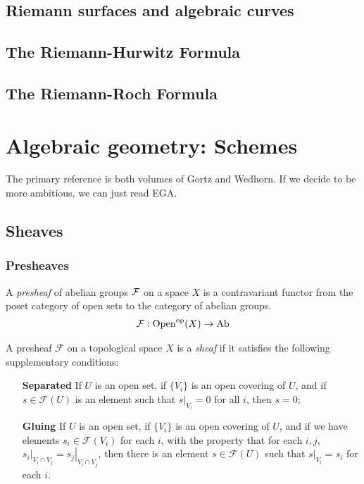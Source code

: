 \documentclass[12pt]{article}
\begin{document}
\subsection{Riemann surfaces and algebraic curves}
\subsection{The Riemann-Hurwitz Formula }
\subsection{The Riemann-Roch Formula}

\section{Algebraic geometry: Schemes}
The primary reference is both volumes of Gortz and Wedhorn. If we decide to be more ambitious, we can just read EGA.

\subsection{Sheaves}
\subsubsection{Presheaves}
\begin{definition}
    A \emph{presheaf} of abelian groups ${\mathcal{F}}$ on a space $X$ is a contravariant functor from the poset category of open sets to the category of abelian groups. \begin{align*}
        {\mathcal{F}}:\operatorname{Open}^{\operatorname{op}}(X) \to \operatorname{Ab}
    \end{align*}
\end{definition}



\begin{definition}
    A presheaf $\mathcal{F}$ on a topological space $X$ is a \emph{sheaf} if it satisfies the following supplementary conditions:

    \begin{enumerate}

        \item[\textbf{Separated}] If $U$ is an open set, if $\{V_{i}\}$ is an open covering of $U$, and if $s \in \mathcal{F}(U)$ is an element such that $\left.s\right|_{V_{i}} = 0$ for all $i$, then $s = 0$;

        \item[\textbf{Gluing}] If $U$ is an open set, if $\{V_{i}\}$ is an open covering of $U$, and if we have elements $s_{i} \in \mathcal{F}(V_{i})$ for each $i$, with the property that for each $i,j$, $\left.s_{i}\right|_{V_{i} \cap V_{j}} = \left.s_{j}\right|_{V_{i} \cap V_{j}}$, then there is an element $s \in \mathcal{F}(U)$ such that $\left.s\right|_{V_{i}} = s_{i}$ for each $i$. 
    \end{enumerate}
\end{definition}
\end{document}
